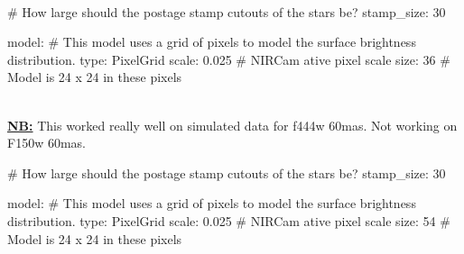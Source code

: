 \documentclass[a4 paper]{article}
\numberwithin{equation}{section}
\newcommand{\0}{\mathbf{0}}
\begin{document}
\begin{figure}[!h]
\end{figure}\\
\begin{python}
# How large should the postage stamp cutouts of the stars be?
    stamp_size: 30

model:
    # This model uses a grid of pixels to model the surface brightness distribution.
    type: PixelGrid
    scale: 0.025      # NIRCam ative pixel scale
    size: 36          # Model is 24 x 24 in these pixels
\end{python}\\
\underline{\textbf{NB:}} This worked really well on simulated data for f444w 60mas. Not working on F150w 60mas. \clearpage
\begin{python}
# How large should the postage stamp cutouts of the stars be?
    stamp_size: 30

model:
    # This model uses a grid of pixels to model the surface brightness distribution.
    type: PixelGrid
    scale: 0.025      # NIRCam ative pixel scale
    size: 54          # Model is 24 x 24 in these pixels
\end{python}\\
\end{document}
